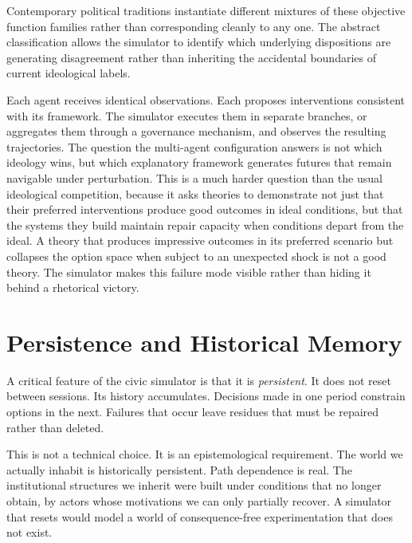\documentclass[12pt]{article}
\begin{document}
Contemporary political traditions instantiate different mixtures of these objective function families rather than corresponding cleanly to any one. The abstract classification allows the simulator to identify which underlying dispositions are generating disagreement rather than inheriting the accidental boundaries of current ideological labels.

Each agent receives identical observations. Each proposes interventions consistent with its framework. The simulator executes them in separate branches, or aggregates them through a governance mechanism, and observes the resulting trajectories. The question the multi-agent configuration answers is not which ideology wins, but which explanatory framework generates futures that remain navigable under perturbation. This is a much harder question than the usual ideological competition, because it asks theories to demonstrate not just that their preferred interventions produce good outcomes in ideal conditions, but that the systems they build maintain repair capacity when conditions depart from the ideal. A theory that produces impressive outcomes in its preferred scenario but collapses the option space when subject to an unexpected shock is not a good theory. The simulator makes this failure mode visible rather than hiding it behind a rhetorical victory.

\section{Persistence and Historical Memory}

A critical feature of the civic simulator is that it is \emph{persistent}. It does not reset between sessions. Its history accumulates. Decisions made in one period constrain options in the next. Failures that occur leave residues that must be repaired rather than deleted.

This is not a technical choice. It is an epistemological requirement. The world we actually inhabit is historically persistent. Path dependence is real. The institutional structures we inherit were built under conditions that no longer obtain, by actors whose motivations we can only partially recover. A simulator that resets would model a world of consequence-free experimentation that does not exist.
\end{document}
